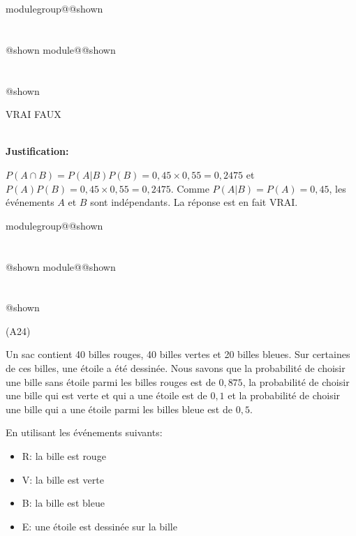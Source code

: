 \documentclass{Evaluation}
\makeatletter
\newcommand{\currentmodulekey}{}
\newcommand{\currentmoduletitle}{}
\newcommand{\currentgroupkey}{}
\newcommand{\currentgrouptitle}{}
\newcommand{\showmoduleifneeded}{%
  \ifx\currentgroupkey\empty\else
    \expandafter\ifx\csname modulegroup@\currentgroupkey @shown\endcsname\relax
      \section*{\currentgrouptitle}%
      \expandafter\gdef\csname modulegroup@\currentgroupkey @shown\endcsname{1}%
    \fi
  \fi
  \expandafter\ifx\csname module@\currentmodulekey @shown\endcsname\relax
    \section*{\currentmoduletitle}%
    \expandafter\gdef\csname module@\currentmodulekey @shown\endcsname{1}%
  \fi
}
\newenvironment{A24}{\showmoduleifneeded}{}
\makeatother
\begin{document}
\begin{questions}
\begin{A24}
\begin{parts}
     \begin{oneparcheckboxes}
		\choice VRAI
		\correctchoice FAUX
\end{oneparcheckboxes}\\
{\bf Justification:}

\begin{solution}
    $P(A\cap B)=P(A|B)P(B)=0,45\times 0,55=0,2475$ et $P(A)P(B)=0,45\times 0,55=0,2475$. Comme $P(A|B)=P(A)=0,45$, les événements $A$ et $B$ sont indépendants. La réponse est en fait VRAI.
\end{solution}

\end{parts}
\end{A24}

\begin{A24}
\question (A24)

Un sac contient 40 billes rouges, 40 billes vertes et 20 billes bleues.
Sur certaines de ces billes, une étoile a été dessinée.
Nous savons que la probabilité de choisir une bille sans étoile parmi les billes rouges est de $0,875$, la probabilité de choisir une bille qui est verte et qui a une étoile est de $0,1$ et la probabilité de choisir une bille qui a une étoile parmi les billes bleue est de $0,5$.

En utilisant les événements suivants:

\begin{itemize}
    \item R: la bille est rouge
    \item V: la bille est verte
    \item B: la bille est bleue
    \item E: une étoile est dessinée sur la bille
\end{itemize}

\end{A24}
\end{questions}
\end{document}
